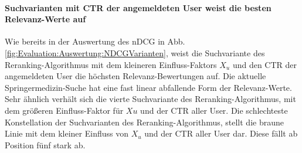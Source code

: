 \paragraph{Suchvarianten mit CTR der angemeldeten User weist die besten Relevanz-Werte auf}
Wie bereits in der Auswertung des nDCG in Abb. \ref{fig:Evaluation:Auswertung:NDCGVarianten}, weist die Suchvariante des Reranking-Algorithmus mit dem kleineren Einfluss-Faktors $X_u$ und den CTR der angemeldeten User die höchsten Relevanz-Bewertungen auf. Die aktuelle Springermedizin-Suche hat eine fast linear abfallende Form der Relevanz-Werte. Sehr ähnlich verhält sich die vierte Suchvariante des Reranking-Algorithmus, mit dem größeren Einfluss-Faktor für $Xu$ und der CTR aller User. Die schlechteste Konstellation der Suchvarianten des Reranking-Algorithmus, stellt die braune Linie mit dem kleiner Einfluss von $X_u$ und der CTR aller User dar. Diese fällt ab Position fünf stark ab.